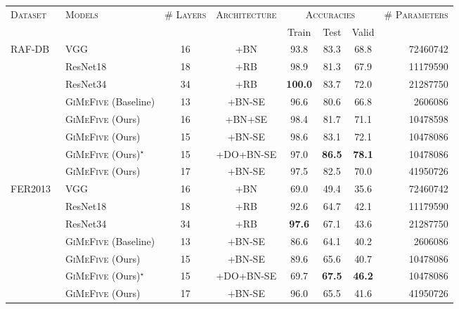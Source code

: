 \begin{table}[ht]
  \centering
  \begin{tabular}{@{}llcccccr@{}}
    \toprule 
    \multirow{2}{*}{\textsc{Dataset}}&\multirow{2}{*}{\textsc{Models}}&\multirow{2}{*}{\textsc{\# Layers}}&\multirow{2}{*}{\textsc{Architecture}} & \multicolumn{3}{c}{\textsc{Accuracies}} & \multirow{2}{*}{\textsc{\# Parameters}} \\
    \cline{5-7}
    &&&& Train & Test & Valid  &  \\
    \midrule
    \multirow{8}{*}{RAF-DB~\cite{li_reliable_2017,li2019reliable}} &VGG~\cite{SimonyanZ14a} & 16 &+BN&93.8&83.3&68.8&72460742\\ 
    & ResNet18~\cite{HeZRS16} & 18 & +RB  & 98.9 & 81.3 & 67.9 & 11179590 \\
    & ResNet34~\cite{HeZRS16} & 34 & +RB  & \textbf{100.0} & 83.7 & 72.0 & 21287750 \\
    &\textsc{GiMeFive} (Baseline) & 13 & +BN-SE & 96.6 & 80.6 & 66.8 & 2606086 \\ 
    &\textsc{GiMeFive} (Ours) & 16 & +BN+SE & 98.4 & 81.7 & 71.1 & 10478598 \\
    &\textsc{GiMeFive} (Ours) & 15 & +BN-SE & 98.6 & 83.1 & 72.1 & 10478086 \\
    &\textsc{GiMeFive} (Ours)\textcolor{LMUGreen}{$^\star$} & 15 & +DO+BN-SE & 97.0 & \textbf{86.5} & \textbf{78.1} & 10478086 \\
    &\textsc{GiMeFive} (Ours) & 17 & +BN-SE & 97.5 & 82.5 & 70.0 & 41950726 \\ 
    \midrule
    \multirow{7}{*}{FER2013~\cite{BarsoumZCZ16}} & VGG~\cite{SimonyanZ14a} & 16 & +BN & 69.0 & 49.4 & 35.6 & 72460742 \\
    & ResNet18~\cite{HeZRS16} & 18 & +RB  & 92.6 & 64.7 & 42.1 & 11179590 \\
    & ResNet34~\cite{HeZRS16} & 34 & +RB  & \textbf{97.6} & 67.1 & 43.6 & 21287750 \\
    & \textsc{GiMeFive} (Baseline) & 13 & +BN-SE & 86.6 & 64.1 & 40.2 & 2606086 \\
    &\textsc{GiMeFive} (Ours) & 15 & +BN-SE & 89.6 & 65.6 & 40.7 & 10478086 \\
    &\textsc{GiMeFive} (Ours)\textcolor{LMUGreen}{$^\star$} & 15 & +DO+BN-SE & 69.7 & \textbf{67.5} & \textbf{46.2} & 10478086 \\
    &\textsc{GiMeFive} (Ours) & 17 & +BN-SE & 96.0 & 65.5 & 41.6 & 41950726 \\

\end{tabular}
\end{table}
